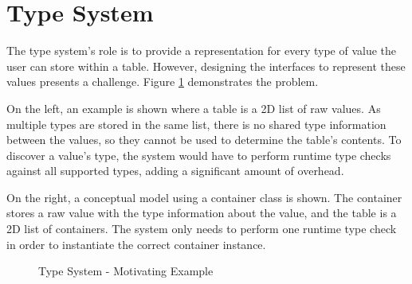 \section{Type System}\label{sec:type-system}
The type system's role is to provide a representation for every type of value the user can store within a table. However, designing the interfaces to represent these values presents a challenge. Figure \ref{fig:type-system-motivation} demonstrates the problem. 

On the left, an example is shown where a table is a 2D list of raw values. As multiple types are stored in the same list, there is no shared type information between the values, so they cannot be used to determine the table's contents. To discover a value's type, the system would have to perform runtime type checks against all supported types, adding a significant amount of overhead. 

On the right, a conceptual model using a container class is shown. The container stores a raw value with the type information about the value, and the table is a 2D list of containers. The system only needs to perform one runtime type check in order to instantiate the correct container instance. 

\begin{figure}[htp]
	\centering
	\centering
	\qquad
	\caption{Type System - Motivating Example}
	\label{fig:type-system-motivation}
\end{figure}


